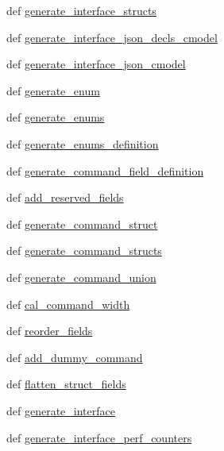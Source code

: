 \begin{DoxyCompactItemize}
\item 
def \hyperlink{namespaceverilog__generator_a49a1884989972fb1a726f96b3146e201}{generate\-\_\-interface\-\_\-structs}
\item 
def \hyperlink{namespaceverilog__generator_ad83aa3e784a06d90a6be26e280258789}{generate\-\_\-interface\-\_\-json\-\_\-decls\-\_\-cmodel}
\item 
def \hyperlink{namespaceverilog__generator_a919d53390e1b3f4da6a3d0dbf4d10724}{generate\-\_\-interface\-\_\-json\-\_\-cmodel}
\item 
def \hyperlink{namespaceverilog__generator_ae4b83fcf3e3b2461c91800ede5e888e8}{generate\-\_\-enum}
\item 
def \hyperlink{namespaceverilog__generator_a553da8ae92faf081b7dc22e8059a1723}{generate\-\_\-enums}
\item 
def \hyperlink{namespaceverilog__generator_a18f8e67a618e687d2f1b4ef4c5f680ad}{generate\-\_\-enums\-\_\-definition}
\item 
def \hyperlink{namespaceverilog__generator_a401902496c836d1a7fc618da16735c1a}{generate\-\_\-command\-\_\-field\-\_\-definition}
\item 
def \hyperlink{namespaceverilog__generator_a99140dae090076df2e9d01865f291b24}{add\-\_\-reserved\-\_\-fields}
\item 
def \hyperlink{namespaceverilog__generator_a52139fc84901842eccf99a1e1223aa2a}{generate\-\_\-command\-\_\-struct}
\item 
def \hyperlink{namespaceverilog__generator_a829131b806a8c3d88f26ecfc56446f51}{generate\-\_\-command\-\_\-structs}
\item 
def \hyperlink{namespaceverilog__generator_a2ae655648b84ad8392c670e1e7408c1f}{generate\-\_\-command\-\_\-union}
\item 
def \hyperlink{namespaceverilog__generator_a3b7d07f63cffa3207219f8aaeb95a4ff}{cal\-\_\-command\-\_\-width}
\item 
def \hyperlink{namespaceverilog__generator_aeae6e39ff58a15ddf0b2ae38834983c5}{reorder\-\_\-fields}
\item 
def \hyperlink{namespaceverilog__generator_a9ab540fa76e47f69d54714fa0f0382e3}{add\-\_\-dummy\-\_\-command}
\item 
def \hyperlink{namespaceverilog__generator_a85e51a16eea5e96c5aa77ea01579bd27}{flatten\-\_\-struct\-\_\-fields}
\item 
def \hyperlink{namespaceverilog__generator_a719ec89eadbdb76c3ba1f8df8f157907}{generate\-\_\-interface}
\item 
def \hyperlink{namespaceverilog__generator_a1a09865dc2428bffadea5669370a1471}{generate\-\_\-interface\-\_\-perf\-\_\-counters}

\end{DoxyCompactItemize}
